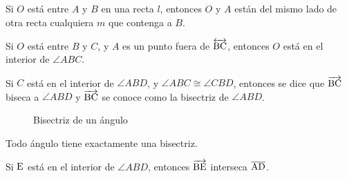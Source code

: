 \begin{theorem}
    Si $O$ está entre $A$ y $B$ en una recta $l$, entonces $O$ y $A$ están del mismo lado de otra recta cualquiera $m$ que contenga a $B$.
\end{theorem}

\begin{theorem}
    Si $O$ está entre $B$ y $C$, y $A$ es un punto fuera de $\overleftrightarrow{\rm BC}$, entonces $O$ está en el interior de $\angle{ABC}$.
\end{theorem}

\begin{definition}
    Si $C$ está en el interior de $\angle{ABD}$, y $\angle{ABC} \cong \angle{CBD}$, entonces se dice que $\overrightarrow{\rm BC}$ biseca a $\angle{ABD}$ y $\overrightarrow{\rm BC}$ se conoce como la bisectriz de $\angle{ABD}$. 

    \begin{figure}[!h]
        \centering
        
        \caption{Bisectriz de un ángulo}
        \label{fig:ang-bizectriz}
    \end{figure}
    
\end{definition}

\begin{theorem}
    Todo ángulo tiene exactamente una bisectriz.
\end{theorem}

\begin{theorem}
    Si $\rm E$ está en el interior de $\angle{ABD}$, entonces $\overrightarrow{\rm BE}$ interseca $\overline{\rm AD}$.
\end{theorem}